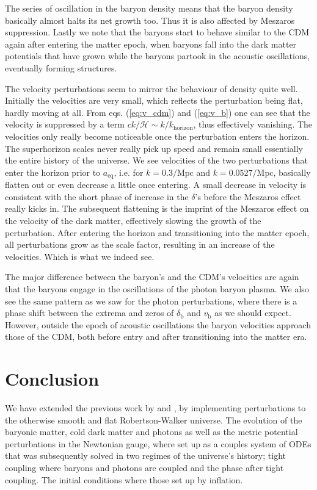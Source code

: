 \documentclass[twocolumn]{aastex62}
\begin{document}
The series of oscillation in the baryon density means that the baryon density basically almost halts its net growth too. Thus it is also affected by Meszaros suppression. Lastly we note that the baryons start to behave similar to the CDM again after entering the matter epoch, when baryons fall into the dark matter potentials that have grown while the baryons partook in the acoustic oscillations, eventually forming structures.

The velocity perturbations seem to mirror the behaviour of density quite well. Initially the velocities are very small, which reflects the perturbation being flat, hardly moving at all. From eqs. (\ref{eq:v_cdm}) and (\ref{eq:v_b}) one can see that the velocity is suppressed by a term $ck / \mathcal{H}\sim k / k_\text{horizon}$, thus effectively vanishing. The velocities only really become noticeable once the perturbation enters the horizon. The superhorizon scales never really pick up speed and remain small essentially the entire history of the universe. We see velocities of the two perturbations that enter the horizon prior to $a_\text{eq}$, i.e. for $k = 0.3 /\mathrm{Mpc}$ and $k = 0.0527/\mathrm{Mpc}$, basically flatten out or even decrease a little once entering. A small decrease in velocity is consistent with the short phase of increase in the $\delta$'s before the Meszaros effect really kicks in. The subsequent flattening is the imprint of the Meszaros effect on the velocity of the dark matter, effectively slowing the growth of the perturbation. After entering the horizon and transitioning into the matter epoch, all perturbations grow as the scale factor, resulting in an increase of the velocities. Which is what we indeed see.

The major difference between the baryon's and the CDM's velocities are again that the baryons engage in the oscillations of the photon baryon plasma. We also see the same pattern as we saw for the photon perturbations, where there is a phase shift between the extrema and zeros of $\delta_\text{b}$ and $v_\text{b}$ as we should expect. However, outside the epoch of acoustic oscillations the baryon velocities approach those of the CDM, both before entry and after transitioning into the matter era.

\section{Conclusion} \label{sec:Conclusion}
We have extended the previous work by \cite{stutzer:2020a} and \cite{stutzer:2020b}, by implementing perturbations to the otherwise smooth and flat Robertson-Walker universe. The evolution of the baryonic matter, cold dark matter and photons as well as the metric potential perturbations in the Newtonian gauge, where set up as a couples system of ODEs that was subsequently solved in two regimes of the universe's history; tight coupling where baryons and photons are coupled and the phase after tight coupling. The initial conditions where those set up by inflation. 
\end{document}
